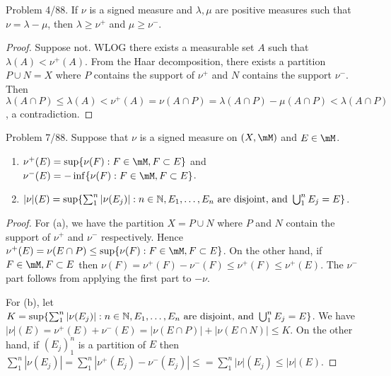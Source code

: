 \documentclass{article}
\begin{document}
 Problem 4/88. If $\nu$ is a signed measure and $\lambda, \mu$ are positive measures such that $\nu = \lambda - \mu$, then $\lambda \ge \nu^+$ and $\mu \ge \nu^-$.
\begin{proof}
Suppose not.  WLOG there exists a measurable set $A$ such that $\lambda(A) < \nu^+(A)$.  From the Haar decomposition, there exists a partition $P \cup N = X$ where $P$ contains the support of $\nu^+$ and $N$ contains the support $\nu^-$.  Then $\lambda(A \cap P) \le \lambda(A) < \nu^+(A) = \nu(A \cap P) = \lambda(A \cap P) - \mu(A \cap P) < \lambda(A \cap P)$, a contradiction.
\end{proof}

 Problem 7/88. Suppose that $\nu$ is a signed measure on $(X, \mM)$ and $E \in \mM$.
\begin{enumerate}[\bfseries a.]

\item $\nu^+(E) = \sup\{\nu(F) : F \in \mM, F \subset E\}$ and $\nu^-(E) = - \inf\{\nu(F) : F \in \mM, F \subset E\}$.

\item $|\nu|(E) = \sup\{\sum_1^n |\nu(E_j)| : n \in \mathbb{N}, E_1, \ldots, E_n \text{ are disjoint, and } \bigcup_1^n E_j = E\}$.
\end{enumerate}

\begin{proof} 
For (a), we have the partition $X = P \cup N$ where $P$ and $N$ contain the support of $\nu^+$ and $\nu^-$ respectively.  Hence $\nu^+(E) = \nu(E \cap P) \le \sup\{\nu(F) : F \in \mM, F \subset E\}$.  On the other hand, if $F \in \mM, F \subset E$ then $\nu(F) = \nu^+(F) - \nu^-(F) \le \nu^+(F) \le \nu^+(E)$. The $\nu^-$ part follows from applying the first part to $-\nu$.

For (b), let $K = \sup\{\sum_1^n |\nu(E_j)| : n \in \mathbb{N}, E_1, \ldots, E_n \text{ are disjoint, and } \bigcup_1^n E_j = E\}$. We have $|\nu|(E) = \nu^+(E) + \nu^-(E) = |\nu(E \cap P)| + |\nu(E \cap N)| \le K$.  On the other hand, if $(E_j)_1^n$ is a partition of $E$ then 
$\sum_1^n |\nu(E_j)| = \sum_1^n |\nu^+(E_j) - \nu^-(E_j)| \le = \sum_1^n |\nu|(E_j) \le |\nu|(E)$. 
\end{proof}
\end{document}
